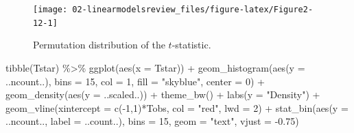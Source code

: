 \documentclass[
]{book}
\newenvironment{Shaded}{\begin{snugshade}}{\end{snugshade}}
\newcommand{\AttributeTok}[1]{\textcolor[rgb]{0.77,0.63,0.00}{#1}}
\newcommand{\DecValTok}[1]{\textcolor[rgb]{0.00,0.00,0.81}{#1}}
\newcommand{\FloatTok}[1]{\textcolor[rgb]{0.00,0.00,0.81}{#1}}
\newcommand{\FunctionTok}[1]{\textcolor[rgb]{0.00,0.00,0.00}{#1}}
\newcommand{\NormalTok}[1]{#1}
\newcommand{\SpecialCharTok}[1]{\textcolor[rgb]{0.00,0.00,0.00}{#1}}
\newcommand{\StringTok}[1]{\textcolor[rgb]{0.31,0.60,0.02}{#1}}
\begin{document}
\begin{figure}[ht!]

{\centering \texttt{[image: 02-linearmodelsreview\_files/figure-latex/Figure2-12-1]} 

}

\caption{Permutation distribution of the \(t\)-statistic.}\label{fig:Figure2-12}
\end{figure}

\newpage

\begin{Shaded}
\begin{Highlighting}[]
\FunctionTok{tibble}\NormalTok{(Tstar) }\SpecialCharTok{\%\textgreater{}\%} \FunctionTok{ggplot}\NormalTok{(}\FunctionTok{aes}\NormalTok{(}\AttributeTok{x =}\NormalTok{ Tstar)) }\SpecialCharTok{+} 
  \FunctionTok{geom\_histogram}\NormalTok{(}\FunctionTok{aes}\NormalTok{(}\AttributeTok{y =}\NormalTok{ ..ncount..), }\AttributeTok{bins =} \DecValTok{15}\NormalTok{, }\AttributeTok{col =} \DecValTok{1}\NormalTok{, }\AttributeTok{fill =} \StringTok{"skyblue"}\NormalTok{, }\AttributeTok{center =} \DecValTok{0}\NormalTok{) }\SpecialCharTok{+} 
  \FunctionTok{geom\_density}\NormalTok{(}\FunctionTok{aes}\NormalTok{(}\AttributeTok{y =}\NormalTok{ ..scaled..)) }\SpecialCharTok{+}
  \FunctionTok{theme\_bw}\NormalTok{() }\SpecialCharTok{+}
  \FunctionTok{labs}\NormalTok{(}\AttributeTok{y =} \StringTok{"Density"}\NormalTok{) }\SpecialCharTok{+}
  \FunctionTok{geom\_vline}\NormalTok{(}\AttributeTok{xintercept =} \FunctionTok{c}\NormalTok{(}\SpecialCharTok{{-}}\DecValTok{1}\NormalTok{,}\DecValTok{1}\NormalTok{)}\SpecialCharTok{*}\NormalTok{Tobs, }\AttributeTok{col =} \StringTok{"red"}\NormalTok{, }\AttributeTok{lwd =} \DecValTok{2}\NormalTok{) }\SpecialCharTok{+}
  \FunctionTok{stat\_bin}\NormalTok{(}\FunctionTok{aes}\NormalTok{(}\AttributeTok{y =}\NormalTok{ ..ncount.., }\AttributeTok{label =}\NormalTok{ ..count..), }\AttributeTok{bins =} \DecValTok{15}\NormalTok{, }
           \AttributeTok{geom =} \StringTok{"text"}\NormalTok{, }\AttributeTok{vjust =} \SpecialCharTok{{-}}\FloatTok{0.75}\NormalTok{)}
\end{Highlighting}
\end{Shaded}
\end{document}
